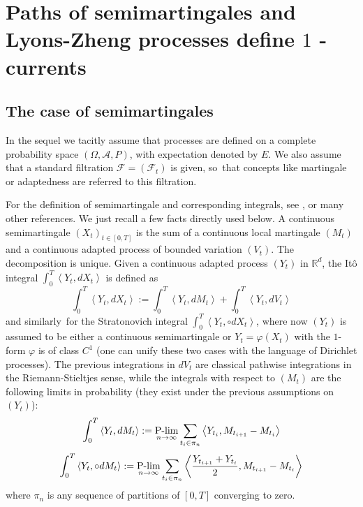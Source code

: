 \documentclass{article}
\begin{document}
\section{Paths of semimartingales and Lyons-Zheng processes define $1$%
-currents}

\subsection{The case of semimartingales}

In the sequel we tacitly assume that processes are defined on a complete
probability space $\left( \Omega ,\mathcal{A},P\right) $, with expectation
denoted by $E$. We also assume that a standard filtration $\mathcal{F}%
=\left( \mathcal{F}_{t}\right) $ is given, so\ that concepts like martingale
or adaptedness are referred to this filtration.

For the definition of semimartingale and corresponding integrals, see \cite
{RY}, \cite{Kunita} or many other references. We just recall a few facts
directly used below. A continuous semimartingale $\left( X_{t}\right) _{t\in %
\left[ 0,T\right] }$ is the sum of a continuous local martingale $\left(
M_{t}\right) $ and a continuous adapted process of bounded variation $\left(
V_{t}\right) $. The decomposition is unique. Given a continuous adapted
process $\left( Y_{t}\right) $ in $\mathbb{R}^{d}$, the It\^{o} integral $%
\int_{0}^{T}\left\langle Y_{t},dX_{t}\right\rangle $ is defined as 
\begin{equation*}
\int_{0}^{T}\left\langle Y_{t},dX_{t}\right\rangle :=\int_{0}^{T}\left\langle
Y_{t},dM_{t}\right\rangle +\int_{0}^{T}\left\langle Y_{t},dV_{t}\right\rangle
\end{equation*}
and similarly\ for the Stratonovich integral $\int_{0}^{T}\left\langle
Y_{t},\circ dX_{t}\right\rangle $, where now $\left( Y_{t}\right) $ is
assumed to be either a continuous semimartingale or $Y_{t}=\varphi \left(
X_{t}\right) $ with the $1$-form $\varphi $ is of class $C^{1}$ (one can
unify these two cases with the language of Dirichlet processes). The
previous integrations in $dV_{t}$ are classical pathwise integrations in the
Riemann-Stieltjes sense, while the integrals with respect to $\left(
M_{t}\right) $ are the following limits in probability (they exist under the
previous assumptions on $\left( Y_{t}\right) $): 
\begin{equation*}
\int_{0}^{T}\left\langle Y_{t},dM_{t}\right\rangle := \operatornamewithlimits{P-lim}_{n\rightarrow
\infty }\sum_{t_{i}\in \pi _{n}}\left\langle
Y_{t_{i}},M_{t_{i+1}}-M_{t_{i}}\right\rangle
\end{equation*}
\begin{equation*}
\int_{0}^{T}\left\langle Y_{t},\circ dM_{t}\right\rangle :=
\operatornamewithlimits{P-lim}_{n\rightarrow \infty }\sum_{t_{i}\in \pi _{n}}\left\langle \frac{%
Y_{t_{i+1}}+Y_{t_{i}}}{2},M_{t_{i+1}}-M_{t_{i}}\right\rangle
\end{equation*}
where $\pi _{n}$ is any sequence of partitions of $\left[ 0,T\right] $
converging to zero.
\end{document}
